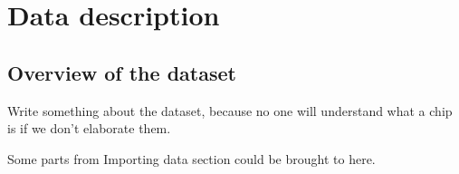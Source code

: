 %
%   
\clearpage
\section{Data description}









\subsection{Overview of the dataset}

Write something about the dataset, because no one will understand what a chip is 
if we don't elaborate them.

Some parts from Importing data section could be brought to here.










